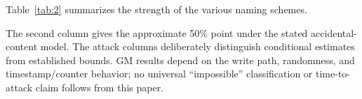Table~\ref{tab:2} summarizes the strength of the various naming
schemes.

The second column gives the approximate 50\% point under the stated
accidental-content model. The attack columns deliberately distinguish
conditional estimates from established bounds. GM results depend on the
write path, randomness, and timestamp/counter behavior; no universal
``impossible'' classification or time-to-attack claim follows from this paper.


